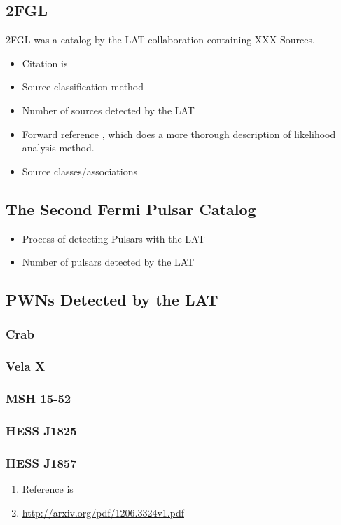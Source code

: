 \subsection{\acf{2FGL}}

\ac{2FGL} was a catalog by the LAT collaboration containing XXX Sources.

\begin{itemize}
  \item Citation is \cite{second_lat_catalog_2012}
  \item Source classification method
  \item Number of sources detected by the \ac{LAT}
  \item Forward reference ,
    which does a more thorough description of likelihood analysis method.
  \item Source classes/associations
\end{itemize}

\subsection{The Second Fermi Pulsar Catalog}

\begin{itemize}
  \item Process of detecting Pulsars with the \ac{LAT}
  \item Number of pulsars detected by the \ac{LAT}
\end{itemize}

\subsection{\acsp{PWN} Detected by the \ac{LAT}}

\subsubsection{Crab}

\subsubsection{Vela X}

\subsubsection{MSH 15-52}

\subsubsection{HESS J1825}

\subsubsection{HESS J1857}


\begin{enumerate}
  \item Reference is \cite{hess_j1857_lat_2012}
  \item \url{http://arxiv.org/pdf/1206.3324v1.pdf}
\end{enumerate}
